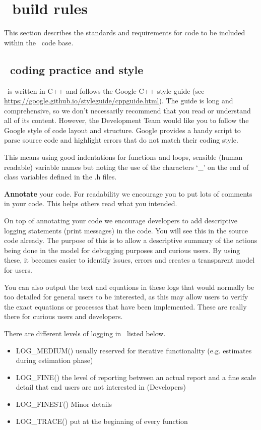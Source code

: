 \section{\CNAME\ build rules\label{sec:build_rules}}

This section describes the standards and requirements for code to be included within the \CNAME\ code base. 

\subsection{\CNAME\ coding practice and style}\label{subsec:code_practive}

\CNAME\ is written in C++ and follows the Google C++ style guide (see \url{https://google.github.io/styleguide/cppguide.html}). The guide is long and comprehensive, so we don't necessarily recommend that you read or understand all of its content. However, the Development Team would like you to follow the Google style of code layout and structure. Google provides a handy script to parse source code and highlight errors that do not match their coding style.

This means using good indentations for functions and loops, sensible (human readable) variable names but noting the use of the characters `\_' on the end of class variables defined in the .h files. 

\textbf{Annotate} your code. For readability we encourage you to put lots of comments in your code. This helps others read what you intended. 

On top of annotating your code we encourage developers to add descriptive logging statements (print messages) in the code. You will see this in the source code already. The purpose of this is to allow a descriptive summary of the actions being done in the model for debugging purposes and curious users. By using these, it becomes easier to identify issues, errors and creates a transparent model for users.

You can also output the text and equations in these logs that would normally be too detailed for general users to be interested, as this may allow users to verify the exact equations or processes that have been implemented. These are really there for curious users and developers.

There are different levels of logging in \CNAME\ listed below.
\begin{itemize}
	\item LOG\_MEDIUM()  usually reserved for iterative functionality (e.g. estimates during estimation phase)
	\item LOG\_FINE() the level of reporting between an actual report and a fine scale detail that end users are not interested in (Developers)
	\item LOG\_FINEST() Minor details
	\item LOG\_TRACE() put at the beginning of every function
\end{itemize}

